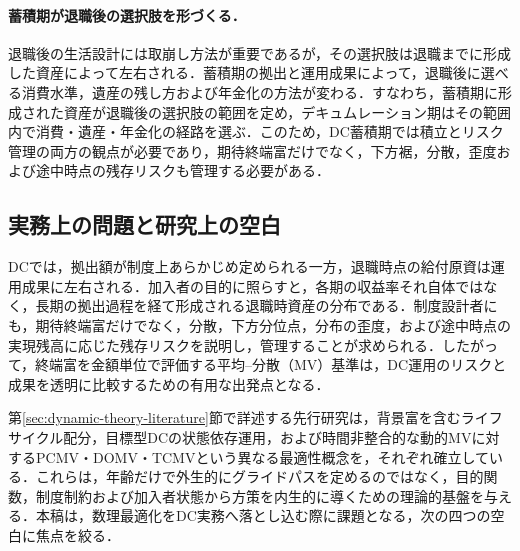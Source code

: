 \documentclass[10pt,a4paper]{article}
\theoremstyle{plain}
\theoremstyle{definition}
\begin{document}
\paragraph{蓄積期が退職後の選択肢を形づくる．}
退職後の生活設計には取崩し方法が重要であるが，その選択肢は退職までに形成した資産によって左右される．蓄積期の拠出と運用成果によって，退職後に選べる消費水準，遺産の残し方および年金化の方法が変わる．すなわち，蓄積期に形成された資産が退職後の選択肢の範囲を定め，デキュムレーション期はその範囲内で消費・遺産・年金化の経路を選ぶ．このため，DC蓄積期では積立とリスク管理の両方の観点が必要であり，期待終端富だけでなく，下方裾，分散，歪度および途中時点の残存リスクも管理する必要がある．

\subsection{実務上の問題と研究上の空白}

DCでは，拠出額が制度上あらかじめ定められる一方，退職時点の給付原資は運用成果に左右される．加入者の目的に照らすと，各期の収益率それ自体ではなく，長期の拠出過程を経て形成される退職時資産の分布である．制度設計者にも，期待終端富だけでなく，分散，下方分位点，分布の歪度，および途中時点の実現残高に応じた残存リスクを説明し，管理することが求められる．したがって，終端富を金額単位で評価する平均--分散（MV）基準は，DC運用のリスクと成果を透明に比較するための有用な出発点となる．

第\ref{sec:dynamic-theory-literature}節で詳述する先行研究は，背景富を含むライフサイクル配分，目標型DCの状態依存運用，および時間非整合的な動的MVに対するPCMV・DOMV・TCMVという異なる最適性概念を，それぞれ確立している．これらは，年齢だけで外生的にグライドパスを定めるのではなく，目的関数，制度制約および加入者状態から方策を内生的に導くための理論的基盤を与える．本稿は，数理最適化をDC実務へ落とし込む際に課題となる，次の四つの空白に焦点を絞る．
\end{document}
